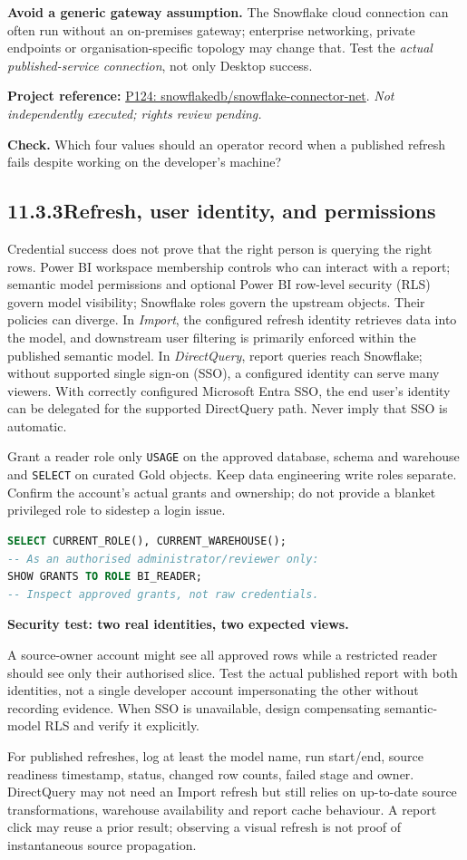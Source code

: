 \documentclass[11pt,twoside]{article}
\newcommand{\topic}[2]{\subsection*{#1\quad #2}}
\newcommand{\repo}[2]{\par\begingroup\fontsize{8.0}{9.6}\selectfont\sffamily\color{inkgray}\textbf{Project reference:} \href{#2}{#1}. \textit{Not independently executed; rights review pending.}\par\endgroup}
\begin{document}
\textbf{Avoid a generic gateway assumption.} The Snowflake cloud connection can often run without an on-premises gateway; enterprise networking, private endpoints or organisation-specific topology may change that. Test the \emph{actual published-service connection}, not only Desktop success.
\repo{P124: snowflakedb/snowflake-connector-net}{https://github.com/snowflakedb/snowflake-connector-net}
\textbf{Check.} Which four values should an operator record when a published refresh fails despite working on the developer's machine?
\newpage
\topic{11.3.3}{Refresh, user identity, and permissions}
Credential success does not prove that the right person is querying the right rows. Power BI workspace membership controls who can interact with a report; semantic model permissions and optional Power BI row-level security (RLS) govern model visibility; Snowflake roles govern the upstream objects. Their policies can diverge. In \emph{Import}, the configured refresh identity retrieves data into the model, and downstream user filtering is primarily enforced within the published semantic model. In \emph{DirectQuery}, report queries reach Snowflake; without supported single sign-on (SSO), a configured identity can serve many viewers. With correctly configured Microsoft Entra SSO, the end user's identity can be delegated for the supported DirectQuery path. Never imply that SSO is automatic.

Grant a reader role only \texttt{USAGE} on the approved database, schema and warehouse and \texttt{SELECT} on curated Gold objects. Keep data engineering write roles separate. Confirm the account's actual grants and ownership; do not provide a blanket privileged role to sidestep a login issue.
\begin{lstlisting}[language=SQL,caption={Review queries for a permitted reviewer; illustrative.}]
SELECT CURRENT_ROLE(), CURRENT_WAREHOUSE();
-- As an authorised administrator/reviewer only:
SHOW GRANTS TO ROLE BI_READER;
-- Inspect approved grants, not raw credentials.
\end{lstlisting}
\begin{insight}\textbf{Security test: two real identities, two expected views.}\par
A source-owner account might see all approved rows while a restricted reader should see only their authorised slice. Test the actual published report with both identities, not a single developer account impersonating the other without recording evidence. When SSO is unavailable, design compensating semantic-model RLS and verify it explicitly.\end{insight}
For published refreshes, log at least the model name, run start/end, source readiness timestamp, status, changed row counts, failed stage and owner. DirectQuery may not need an Import refresh but still relies on up-to-date source transformations, warehouse availability and report cache behaviour. A report click may reuse a prior result; observing a visual refresh is not proof of instantaneous source propagation.
\end{document}
